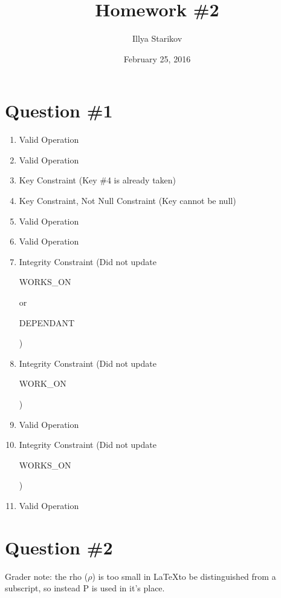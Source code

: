 \documentclass{article}
\title{Homework \#2}
\author{Illya Starikov}
\date{February 25, 2016}
\newcommand{\Rho}{\mathrm{P}}
\begin{document}
\maketitle

\section*{Question \#1}
\begin{enumerate}[label=\alph*.]
    \item Valid Operation
    \item Valid Operation
    \item Key Constraint (Key \#4 is already taken)
    \item Key Constraint, Not Null Constraint (Key cannot be null)
    \item Valid Operation
    \item Valid Operation
    \item Integrity Constraint (Did not update \begin{verb} WORKS_ON \end{verb} or \begin{verb} DEPENDANT \end{verb})
    \item Integrity Constraint (Did not update
    \begin{verb} WORK_ON \end{verb})
    \item Valid Operation
    \item Integrity Constraint (Did not update \begin{verb} WORKS_ON \end{verb})
    \item Valid Operation
\end{enumerate}

\section*{Question \#2}
Grader note: the rho ($\rho$) is too small in \LaTeX to be distinguished from a subscript, so instead $\Rho$ is used in it's place.
\end{document}
